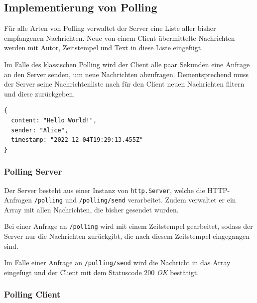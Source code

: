 \documentclass[sigplan, screen]{acmart}
\begin{document}
\subsection{Implementierung von Polling}

Für alle Arten von Polling verwaltet der Server eine Liste aller bisher empfangenen Nachrichten.
Neue von einem Client übermittelte Nachrichten werden mit Autor, Zeitstempel und Text in diese Liste eingefügt.

Im Falle des klassischen Polling wird der Client alle paar Sekunden eine Anfrage an den Server senden, um neue Nachrichten abzufragen.
Dementsprechend muss der Server seine Nachrichtenliste nach für den Client neuen Nachrichten filtern und diese zurückgeben.

\begin{lstlisting}[caption={Beispielhafte Nachricht}, label={lst:message-json}, numbers=none]
{
  content: "Hello World!",
  sender: "Alice",
  timestamp: "2022-12-04T19:29:13.455Z"
}
\end{lstlisting}

\subsubsection{Polling Server}

Der Server besteht aus einer Instanz von \texttt{http.Server}, welche die HTTP-Anfragen \texttt{/polling} und \texttt{/polling/send} verarbeitet.
Zudem verwaltet er ein Array mit allen Nachrichten, die bisher gesendet wurden.

Bei einer Anfrage an \texttt{/polling} wird mit einem Zeitstempel gearbeitet,
sodass der Server nur die Nachrichten zurückgibt, die nach diesem Zeitstempel eingegangen sind.



Im Falle einer Anfrage an \texttt{/polling/send} wird die Nachricht in das Array eingefügt und der Client mit dem Statuscode 200 \emph{OK} bestätigt.



\subsubsection{Polling Client}
\end{document}
